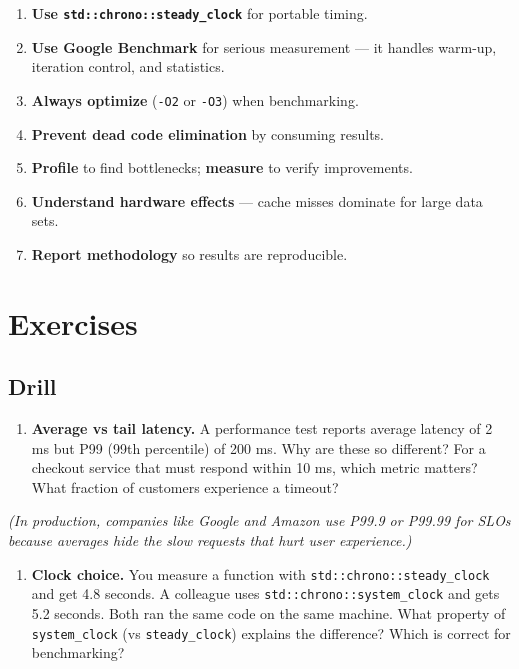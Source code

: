 \begin{enumerate}
\item \textbf{Use \texttt{std::chrono::steady\_clock}} for portable timing.
\item \textbf{Use Google Benchmark} for serious measurement — it handles warm-up, iteration control, and statistics.
\item \textbf{Always optimize} (\texttt{-O2} or \texttt{-O3}) when benchmarking.
\item \textbf{Prevent dead code elimination} by consuming results.
\item \textbf{Profile} to find bottlenecks; \textbf{measure} to verify improvements.
\item \textbf{Understand hardware effects} — cache misses dominate for large data sets.
\item \textbf{Report methodology} so results are reproducible.
\end{enumerate}

\section{Exercises}

\subsection{Drill}

\begin{enumerate}
\item \textbf{Average vs tail latency.} A performance test reports average latency of 2 ms but P99 (99th percentile) of 200 ms. Why are these so different? For a checkout service that must respond within 10 ms, which metric matters? What fraction of customers experience a timeout?
\end{enumerate}

   \textit{(In production, companies like Google and Amazon use P99.9 or P99.99 for SLOs because averages hide the slow requests that hurt user experience.)}

\begin{enumerate}
\item \textbf{Clock choice.} You measure a function with \texttt{std::chrono::steady\_clock} and get 4.8 seconds. A colleague uses \texttt{std::chrono::system\_clock} and gets 5.2 seconds. Both ran the same code on the same machine. What property of \texttt{system\_clock} (vs \texttt{steady\_clock}) explains the difference? Which is correct for benchmarking?
\end{enumerate}

